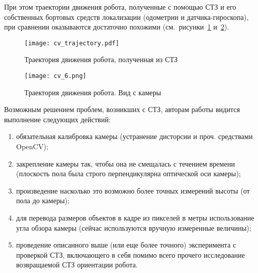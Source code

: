 При этом траектории движения робота, полученные с помощью СТЗ и его собственных бортовых средств локализации (одометрии и датчика-гироскопа), при сравнении оказываются достаточно похожими (см.~рисунки~\ref{cv_trajectory} и~\ref{cv_trajectory_real}).

\begin{figure}[h!]
	\centering
	\texttt{[image: cv\_trajectory.pdf]}
	\caption{Траектория движения робота, полученная из СТЗ}
	\label{cv_trajectory}
\end{figure}

\begin{figure}[h!]
	\centering
	\texttt{[image: cv\_6.png]}
	\caption{Траектория движения робота. Вид с камеры}
	\label{cv_trajectory_real}
\end{figure}

\clearpage
Возможным решением проблем, возникших с СТЗ, авторам работы видится выполнение следующих действий:
\begin{enumerate}
	\item обязательная калибровка камеры (устранение дисторсии и проч. средствами\\ OpenCV);
	\item закрепление камеры так, чтобы она не смещалась с течением времени (плоскость пола была строго перпендикулярна оптической оси камеры);
	\item произведение насколько это возможно более точных измерений высоты (от пола до камеры);
	\item для перевода размеров объектов в кадре из пикселей в метры использование угла обзора камеры (сейчас используются вручную измеренные величины);
	\item проведение описанного выше (или еще более точного) эксперимента с проверкой СТЗ, включающего в себя помимо всего прочего исследование возвращаемой СТЗ ориентации робота.
\end{enumerate}